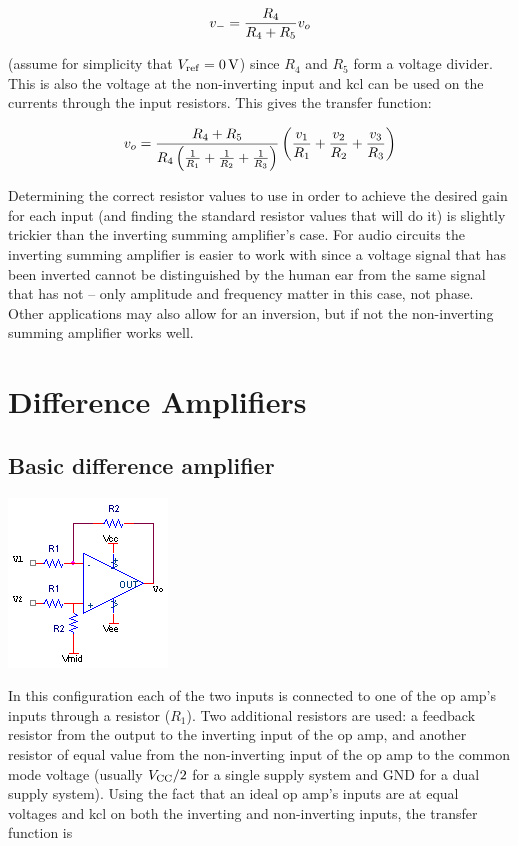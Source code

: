 \begin{equation}
v_{-} = \frac{R_4}{R_4+R_5}v_o
\end{equation}

\noindent (assume for simplicity that $V\sub{ref} = \SI{0}{\V}$) since $R_4$ and $R_5$ form a voltage divider.
This is also the voltage at the non-inverting input and \ac{kcl} can be used on the currents through the input resistors.
This gives the transfer function:

\textcolor{red}{
\begin{equation}
v_o = \frac{R_4+R_5}{R_4\left(\frac{1}{R_1} + \frac{1}{R_2} + \frac{1}{R_3}\right)}\left(\frac{v_1}{R_1} + \frac{v_2}{R_2} + \frac{v_3}{R_3}\right)
\label{eq:summingamp}
\end{equation}
}

Determining the correct resistor values to use in order to achieve the desired gain for each input (and finding the standard resistor values that will do it) is slightly trickier than the inverting summing amplifier's case.
For audio circuits the inverting summing amplifier is easier to work with since a voltage signal that has been inverted cannot be distinguished by the human ear from the same signal that has not -- only amplitude and frequency matter in this case, not phase.
Other applications may also allow for an inversion, but if not the non-inverting summing amplifier works well.

\section{Difference Amplifiers}

\subsection{Basic difference amplifier}
\begin{center}
	\includegraphics{schematics/differenceamp.PNG}
\end{center}
In this configuration each of the two inputs is connected to one of the op amp's inputs through a resistor ($R_1$).
Two additional resistors are used:
a feedback resistor from the output to the inverting input of the op amp, and another resistor of equal value from the non-inverting input of the op amp to the common mode voltage (usually $V_\mathrm{CC}/2$ for a single supply system and GND for a dual supply system).
Using the fact that an ideal op amp's inputs are at equal voltages and \ac{kcl} on both the inverting and non-inverting inputs, the transfer function is

